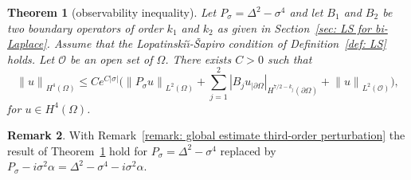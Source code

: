 \documentclass[10pt]{amsart}
\theoremstyle{plain}
\newtheorem{theorem}{Theorem}[section]
\theoremstyle{definition}
\newtheorem{remark}[theorem]{Remark}
\newcommand{\LS}{Lopatinski\u{\i}-\v{S}apiro\xspace}
\newcommand{\scrO}{\mathscr O}
\newcommand{\bd}{\ensuremath{_{|\partial\Omega}}}
\newcommand{\Norm}[2]{{\| #1 \|}_{#2}}
\newcommand{\norm}[2]{{|#1|}_{#2}}
\newcommand{\Psig}{P_{\sigma}}
\begin{document}
\begin{theorem}[observability inequality]
\label{th: observation}
Let $\Psig = \Delta^2 - \sigma^4$ and
let $B_1$ and $B_2$ be two boundary operators of order $k_1$ and
$k_2$ as given in Section~\ref{sec: LS for bi-Laplace}.
Assume that the \LS condition of Definition~\ref{def: LS} holds.
Let $\scrO$ be an open set of $\Omega$. There exists $C>0$ such that
\begin{equation*}
\Norm{u}{H^4(\Omega)} \leq C
e^{C|\sigma|} \big(\Norm{\Psig u}{L^2(\Omega)}
+ \sum_{j=1}^{2} \norm{B_j u\bd}{H^{7/2-k_j}(\partial\Omega)}
+ \Norm{u}{L^2(\scrO)}
\big),
\end{equation*}
for $u \in H^4(\Omega)$.
\end{theorem}

\begin{remark}
\label{remark: observability third-order perturbation}
With Remark~\ref{remark: global estimate third-order perturbation} the
result of Theorem~\ref{th: observation} hold for $\Psig= \Delta^2 -\sigma^4$ replaced by $\Psig-i \sigma^2 \alpha = \Delta^2 -\sigma^4 -i \sigma^2 \alpha $.
\end{remark}
\end{document}
